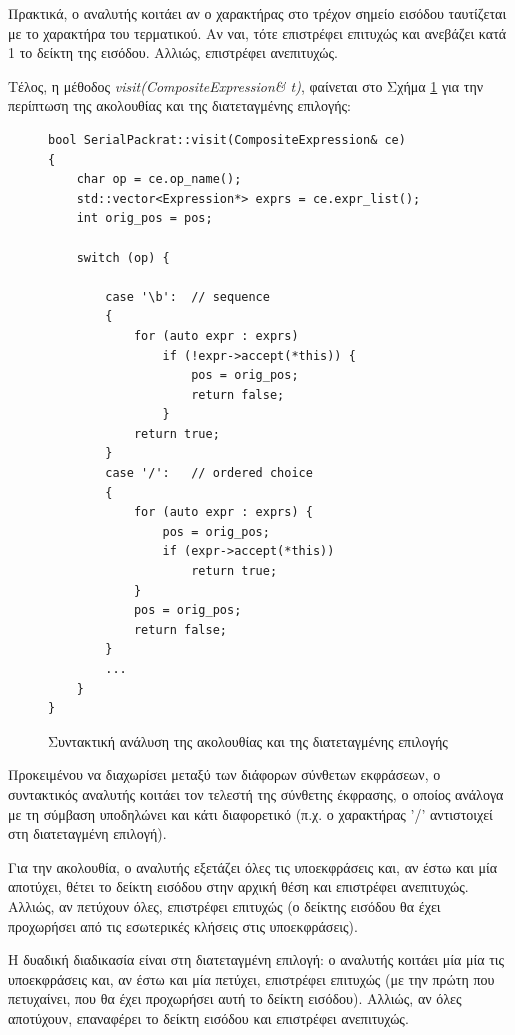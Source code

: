 Πρακτικά, ο αναλυτής κοιτάει αν ο χαρακτήρας στο τρέχον σημείο εισόδου ταυτίζεται με το χαρακτήρα του τερματικού.
Αν ναι, τότε επιστρέφει επιτυχώς και ανεβάζει κατά 1 το δείκτη της εισόδου.
Αλλιώς, επιστρέφει ανεπιτυχώς.

Τέλος, η μέθοδος \textit{visit(CompositeExpression\& t)}, φαίνεται στο Σχήμα \ref{fig:visit_ce} για την περίπτωση της ακολουθίας και της διατεταγμένης επιλογής:

\begin{figure}[h]
\setlength\partopsep{-\topsep}%
\begin{verbatim}
bool SerialPackrat::visit(CompositeExpression& ce)
{
    char op = ce.op_name();
    std::vector<Expression*> exprs = ce.expr_list();
    int orig_pos = pos;

    switch (op) {

        case '\b':  // sequence
        {
            for (auto expr : exprs)
                if (!expr->accept(*this)) {
                    pos = orig_pos;
                    return false;
                }
            return true;
        }
        case '/':   // ordered choice
        {
            for (auto expr : exprs) {
                pos = orig_pos;
                if (expr->accept(*this))
                    return true;
            }
            pos = orig_pos;
            return false;
        }
        ...
    }
}
\end{verbatim}
  \caption{Συντακτική ανάλυση της ακολουθίας και της διατεταγμένης επιλογής}
  \label{fig:visit_ce}
\end{figure}

Προκειμένου να διαχωρίσει μεταξύ των διάφορων σύνθετων εκφράσεων, ο συντακτικός αναλυτής κοιτάει τον τελεστή της σύνθετης έκφρασης, ο οποίος ανάλογα με τη σύμβαση υποδηλώνει και κάτι διαφορετικό (π.χ. ο χαρακτήρας '/' αντιστοιχεί στη διατεταγμένη επιλογή).

Για την ακολουθία, ο αναλυτής εξετάζει όλες τις υποεκφράσεις και, αν έστω και μία αποτύχει, θέτει το δείκτη εισόδου στην αρχική θέση και επιστρέφει ανεπιτυχώς.
Αλλιώς, αν πετύχουν όλες, επιστρέφει επιτυχώς (ο δείκτης εισόδου θα έχει προχωρήσει από τις εσωτερικές κλήσεις στις υποεκφράσεις).

Η δυαδική διαδικασία είναι στη διατεταγμένη επιλογή: ο αναλυτής κοιτάει μία μία τις υποεκφράσεις και, αν έστω και μία πετύχει, επιστρέφει επιτυχώς (με την πρώτη που πετυχαίνει, που θα έχει προχωρήσει αυτή το δείκτη εισόδου).
Αλλιώς, αν όλες αποτύχουν, επαναφέρει το δείκτη εισόδου και επιστρέφει ανεπιτυχώς.
